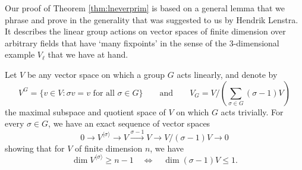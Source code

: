 \documentclass{amsart}
\theoremstyle{plain}
\theoremstyle{definition}
\newcommand{\tto}{\longrightarrow}
\newcommand{\mapright}[1]{\mathop{\longrightarrow}\limits^{#1}}
\begin{document}
Our proof of Theorem \ref{thm:lneverprim}
is based on a general lemma that we phrase and prove in the generality
that was suggested to us by Hendrik Lenstra.
It describes the linear group actions on vector spaces of finite 
dimension over arbitrary fields that have `many fixpoints' 
in the sense of the 3-dimensional example $V_\ell$ that we have at hand.

\medskip\noindent
Let $V$ be any vector space on which a group $G$ acts linearly, and denote by
$$
V^G=\{v\in V: \sigma v=v \text{ for all }\sigma \in G\}
\qquad\text{and}\qquad
V_G= V/(\textstyle\sum_{\sigma\in G} (\sigma-1)V)
$$
the maximal subspace and quotient space of $V$
on which $G$ acts trivially.
For every $\sigma \in G$, we have an exact sequence of vector spaces
$$
0\tto V^{\langle\sigma\rangle} \tto V \mapright {\sigma-1} V
\tto V/(\sigma-1)V\to 0
$$
showing that for $V$ of finite dimension $n$,
we have 
\begin{equation}
\label{invariants-translation}
\dim V^{\langle\sigma\rangle}\ge n-1 
\quad\Longleftrightarrow\quad
\dim (\sigma-1)V \le 1.
\end{equation}
\end{document}
